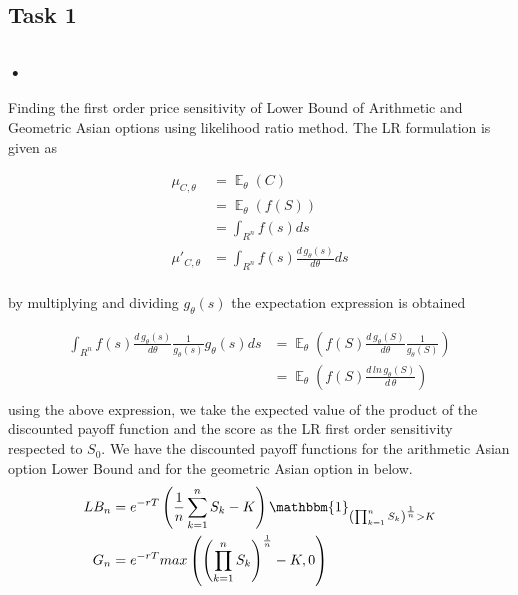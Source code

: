 \documentclass[10pt,oneside,a4paper]{article}
\DeclareMathOperator{\E}{\mathbb{E}}
\begin{document}
\begin{flushleft}


\section{Task 1}
\subsection{}
\subsubsection{•}
Finding the first order price sensitivity of Lower Bound of Arithmetic and Geometric Asian options using likelihood ratio method. The LR formulation is given as

\begin{align*}
\mu_{C, \theta} &= \E_\theta \left(C\right) \\
& = \E_\theta\left(f \left(S\right)\right) \\
& = \int_{R^n}^{} f \left(s\right) ds\\
\mu'_{C, \theta}&= \int_{R^n}^{} f \left(s\right)\frac{d \, g_\theta\left(s\right)}{d\theta}ds\\
\end{align*}

by multiplying and dividing $g_\theta\left(s\right)$ the expectation expression is obtained

\begin{align*}
\int_{R^n}^{} f \left(s\right)\frac{d \, g_\theta\left(s\right)}{d \theta} \frac{1}{g_\theta\left(s\right) }g_\theta\left(s\right) ds &= \E_\theta \left(f\left(S\right)\frac{d \, g_\theta\left(S\right)}{d \theta} \frac{1}{g_\theta\left(S\right) }\right)\\
&= \E_\theta \left(f\left(S\right)\frac{d \,ln \, g_\theta \left(S\right)}{d \, \theta}\right)\\
\end{align*}
using the above expression, we take the expected value of the product of the discounted payoff function and the score as the LR first order sensitivity respected to $S_0$. We have the discounted payoff functions for the arithmetic Asian option Lower Bound  and for the geometric Asian option in below.
\begin{align*}
LB_n &= e^{-rT}\left( \frac{1}{n}\sum_{k=1}^{n}S_k - K\right) \mathbbm{1}_{\left( \prod_{k=1}^{n}S_k\right) ^{\frac{1}{n}} >K}\\
G_n &= e^{-rT} max \left(\left(\prod_{k=1}^{n}S_k\right) ^{\frac{1}{n}} - K, 0 \right)\\
\end{align*}


\end{flushleft}
\end{document}
